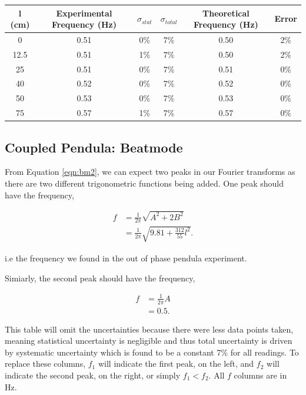 \documentclass{article}
\begin{document}
\begin{table} [H]
    \centering
    \begin{tabular} {c|c|c|c|c|c}
        l (cm) & Experimental Frequency (Hz) & $\sigma_{stat}$ & $\sigma_{total}$ & 
        Theoretical Frequency (Hz) & Error \\
        \hline
        0 & 0.51 & 0\% & 7\% & 0.50 & 2\% \\
        \hline 
        12.5 & 0.51 & 1\% & 7\% & 0.50 & 2\% \\
        \hline
        25 & 0.51 & 0\% & 7\% & 0.51 & 0\% \\
        \hline
        40 & 0.52 & 0\% & 7\% & 0.52 & 0\% \\
        \hline
        50 & 0.53 & 0\% & 7\% & 0.53 & 0\% \\
        \hline
        75 & 0.57 & 1\% & 7\% & 0.57 & 0\% 
    \end{tabular}
\end{table}

\subsection{Coupled Pendula: Beatmode}
From Equation \ref{eqn:bm2}, we can expect two peaks in our Fourier transforms as
there are two different trigonometric functions being added. One peak should have the 
frequency,

\begin{equation}
    \begin{split}
        f &= \frac{1}{2\pi}\sqrt{A^2+2B^2} \\
        &= \frac{1}{2\pi}\sqrt{9.81+\frac{312}{55}l^2}. 
    \end{split}
\end{equation}

i.e the frequency we found in the out of phase pendula experiment.

Simiarly, the second peak should have the frequency,

\begin{equation}
    \begin{split}
        f &= \frac{1}{2\pi}A \\
        &= 0.5.
    \end{split}
\end{equation}

This table will omit the uncertainties because there were less data points taken, meaning
statistical uncertainty is negligible and thus total uncertainty is driven by systematic
uncertainty which is found to be a constant 7\% for all readings. To replace these columns,
$f_1$ will indicate the first peak, on the left, and $f_2$ will indicate the second peak, 
on the right, or simply $f_1 < f_2$. All $f$ columns are in Hz.
\end{document}
